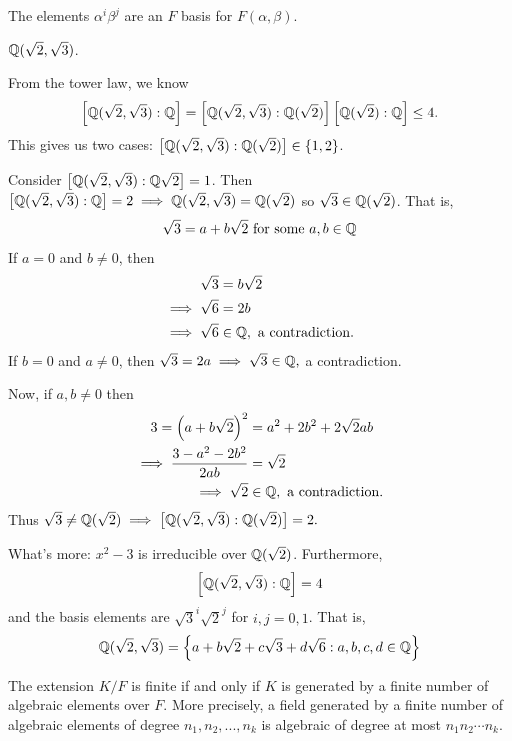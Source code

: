 \begin{note}
    The elements $\alpha^i\beta^j$ are an $F$ basis for $F(\alpha, \beta)$.
\end{note}

\begin{example}
    $\mathbb{Q}(\sqrt{2}, \sqrt{3})$.

    From the tower law, we know
    $$\left[\mathbb{Q}(\sqrt{2}, \sqrt{3}) : \mathbb{Q}\right] = \left[\mathbb{Q}(\sqrt{2}, \sqrt{3}) : \mathbb{Q}(\sqrt{2})\right]\left[\mathbb{Q}(\sqrt{2}) : \mathbb{Q}\right] \leq 4.$$
    This gives us two cases: $\left[\mathbb{Q}(\sqrt{2}, \sqrt{3}) : \mathbb{Q}(\sqrt{2})\right] \in \left\{1, 2\right\}$.

    Consider $\left[\mathbb{Q}(\sqrt{2}, \sqrt{3}) : \mathbb{Q}\sqrt{2}\right] = 1$. Then $\left[\mathbb{Q}(\sqrt{2}, \sqrt{3}) : \mathbb{Q}\right]=2 \implies \mathbb{Q}(\sqrt{2}, \sqrt{3}) = \mathbb{Q}(\sqrt{2})$ so $\sqrt{3}\in \mathbb{Q}(\sqrt{2})$. That is,
    $$\sqrt{3} = a+b \sqrt{2} \text{ for some } a, b \in \mathbb{Q}$$
    If $a = 0$ and $b \neq 0$, then
    \begin{align*}
        \sqrt{3} &=b\sqrt{2} \\
        \implies \sqrt{6} &= 2b \\
        \implies \sqrt{6}&\in \mathbb{Q}, \text{ a contradiction.}
    \end{align*}
    If $b = 0$ and $a \neq 0$, then $\sqrt{3} = 2a \implies \sqrt{3}\in \mathbb{Q},$ a contradiction.

    Now, if $a,b \neq 0$ then
    \begin{align*}
        3 = \left(a+b\sqrt{2}\right)^2 &= a^2+2b^2+2\sqrt{2}ab \\
        \implies \dfrac{3-a^2-2b^2}{2ab}&=\sqrt{2} \\
        \implies \sqrt{2} &\in \mathbb{Q}, \text{ a contradiction.}
    \end{align*}
    Thus $\sqrt{3} \neq \mathbb{Q}(\sqrt{2}) \implies \left[\mathbb{Q}(\sqrt{2},\sqrt{3}) : \mathbb{Q}(\sqrt{2})\right] = 2.$

    What's more: $x^2 - 3$ is irreducible over $\mathbb{Q}(\sqrt{2})$. Furthermore,
    $$\left[\mathbb{Q}(\sqrt{2}, \sqrt{3}) : \mathbb{Q}\right]= 4$$
    and the basis elements are $\sqrt{3}^i \sqrt{2}^j$ for $i,j = 0,1$. That is,
    $$\mathbb{Q}(\sqrt{2}, \sqrt{3}) = \left\{a+b\sqrt{2}+c\sqrt{3}+d\sqrt{6} : a,b,c,d \in \mathbb{Q}\right\}$$
\end{example}

\begin{theorem}
    The extension $K/F$ is finite if and only if $K$ is generated by a finite number of algebraic elements over $F$. More precisely, a field generated by a finite number of algebraic elements of degree $n_1, n_2, ..., n_k$ is algebraic of degree at most $n_1n_2 \cdots n_k$.
\end{theorem}

